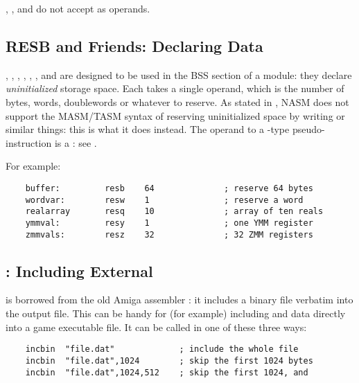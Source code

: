 , ,  and  do not accept
 as operands.

\subsection{RESB and Friends: Declaring  Data}
\label{subsec:resb}

, , , ,
, ,  and 
are designed to be used in the BSS section of a module: they declare
\emph{uninitialized} storage space. Each takes a single operand, which is
the number of bytes, words, doublewords or whatever to reserve. As stated
in , NASM does not support the MASM/TASM syntax of
reserving uninitialized space by writing  or similar
things: this is what it does instead. The operand to a -type
pseudo-instruction is a :
see .

For example:

\begin{lstlisting}
	buffer:         resb    64              ; reserve 64 bytes
	wordvar:        resw    1               ; reserve a word
	realarray       resq    10              ; array of ten reals
	ymmval:         resy    1               ; one YMM register
	zmmvals:        resz    32              ; 32 ZMM registers
\end{lstlisting}

\subsection{: Including External }
\label{subsec:incbin}

 is borrowed from the old Amiga assembler :
it includes a binary file verbatim into the output file. This can be handy
for (for example) including  and  data
directly into a game executable file. It can be called in one of these
three ways:

\begin{lstlisting}
	incbin  "file.dat"             ; include the whole file
	incbin  "file.dat",1024        ; skip the first 1024 bytes
	incbin  "file.dat",1024,512    ; skip the first 1024, and
\end{lstlisting}

